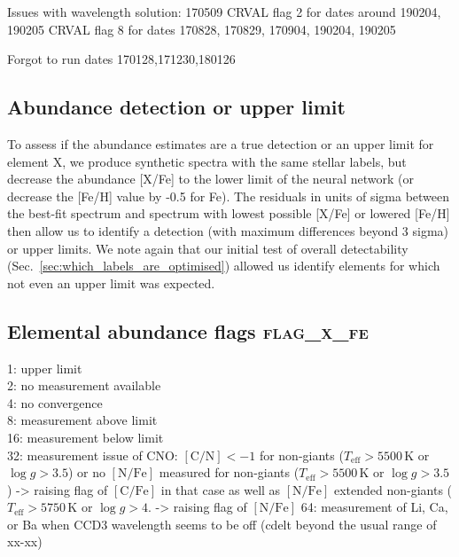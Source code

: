 \documentclass[
  journal=pasa,
  manuscript=research-paper, %
  year=2023,
  volume=37
]{cup-journal}
\begin{document}
Issues with wavelength solution: 170509
CRVAL flag 2 for dates around 190204, 190205
CRVAL flag 8 for dates 170828, 170829, 170904, 190204, 190205

Forgot to run dates 170128,171230,180126


\subsection{Abundance detection or upper limit}
\label{sec:abundance_detection_or_upper_limit}

To assess if the abundance estimates are a true detection or an upper limit for element X, we produce synthetic spectra with the same stellar labels, but decrease the abundance [X/Fe] to the lower limit of the neural network (or decrease the [Fe/H] value by -0.5 for Fe). The residuals in units of sigma between the best-fit spectrum and spectrum with lowest possible [X/Fe] or lowered [Fe/H] then allow us to identify a detection (with maximum differences beyond 3 sigma) or upper limits. We note again that our initial test of overall detectability (Sec.~\ref{sec:which_labels_are_optimised}) allowed us identify elements for which not even an upper limit was expected.

\subsection{Elemental abundance flags \textsc{flag\_x\_fe}}
\label{sec:flag_x_fe}

1: upper limit \\ 
2: no measurement available\\
4: no convergence\\
8: measurement above limit\\
16: measurement below limit\\
32: measurement issue of CNO: $\mathrm{[C/N]} < -1$ for non-giants ($T_\text{eff} > 5500\,\mathrm{K}$ or $\log g > 3.5$) or no $\mathrm{[N/Fe]}$ measured for non-giants ($T_\text{eff} > 5500\,\mathrm{K}$ or $\log g > 3.5$) -> raising flag of $\mathrm{[C/Fe]}$ in that case as well as
$\mathrm{[N/Fe]}$ extended non-giants ($T_\text{eff} > 5750\,\mathrm{K}$ or $\log g > 4.$ -> raising flag of $\mathrm{[N/Fe]}$
64: measurement of Li, Ca, or Ba when CCD3 wavelength seems to be off (cdelt beyond the usual range of xx-xx) \\
\end{document}

